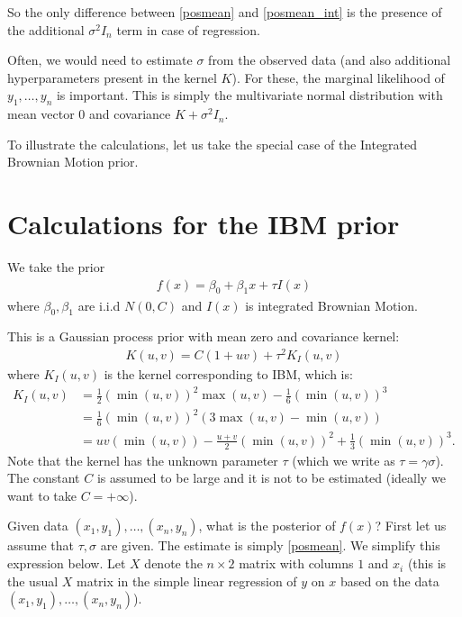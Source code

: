 \documentclass{scrartcl}
\begin{document}
So the only difference between \eqref{posmean} and \eqref{posmean_int}
is the presence of the additional $\sigma^2 I_n$ term in case of
regression.

Often, we would need to estimate $\sigma$ from the observed data (and
also additional hyperparameters present in the kernel $K$). For these,
the marginal likelihood of $y_1, \dots, y_n$ is important. This is
simply the multivariate normal distribution with mean vector 0 and
covariance $K + \sigma^2 I_n$. 

To illustrate the calculations, let us take the special case of the Integrated
Brownian Motion prior. 

\section{Calculations for the IBM prior}

We take the prior
\begin{align*}
  f(x) = \beta_0 + \beta_1 x + \tau I(x) 
\end{align*}
where $\beta_0, \beta_1$ are i.i.d $N(0, C)$ and $I(x)$ is integrated
Brownian Motion.

This is a Gaussian process prior with mean zero and covariance kernel:
\begin{align*}
  K(u, v) = C(1 + uv) + \tau^2 K_I(u, v)
\end{align*}
where $K_I(u, v)$ is the kernel corresponding to IBM, which is:
\begin{align*}
  K_I(u, v) &= \frac{1}{2} \left(\min(u, v) \right)^2\max(u, v)  -
              \frac{1}{6} \left(\min(u, v)\right)^3 \\
&= \frac{1}{6} \left(\min(u, v) \right)^2 \left(3 \max(u, v) - \min(u,
  v) \right) \\
&= u v (\min(u, v)) - \frac{u+v}{2} \left(\min(u, v) \right)^2 +
  \frac{1}{3} \left(\min(u, v) \right)^3. 
\end{align*}
Note that the kernel has the unknown parameter $\tau$ (which we write
as $\tau = \gamma \sigma$). The constant $C$ is assumed to be large
and it is not to be estimated (ideally we want to take $C =
+\infty$). 

Given data $(x_1, y_1), \dots, (x_n, y_n)$, what is the posterior of
$f(x)$? First let us assume that $\tau, \sigma$ are given. The
estimate is simply \eqref{posmean}. We simplify this expression
below. Let $X$ denote the $n \times 2$ matrix with columns $1$ and
$x_i$ (this is the usual $X$ matrix in the simple linear regression of
$y$ on $x$ based on the data $(x_1, y_1), \dots, (x_n, y_n)$). 
\end{document}
